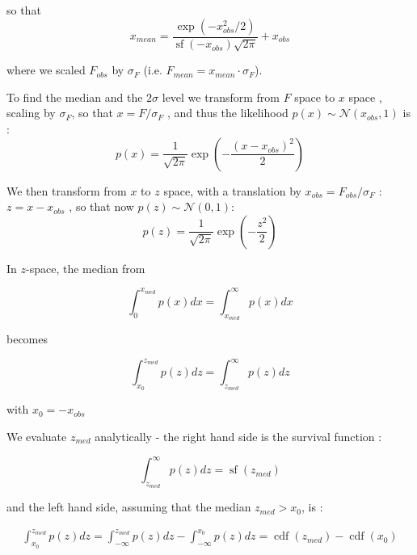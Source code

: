 \documentclass[fleqn,usenatbib]{mnras}  %
\DeclareMathOperator\cdf{cdf}
\DeclareMathOperator\sf{sf}
\begin{document}
so that 
\begin{equation}
x_{mean} = \frac{\exp{(- x_{obs}^{2} / 2 )} }{\sf{(-x_{obs})}\sqrt{2 \pi}} + x_{obs} 
\end{equation}

where we scaled $F_{obs}$ by  $\sigma_F$  (i.e. $F_{mean} = x_{mean} \cdot \sigma_{F}$). 



\bigskip

To find the median and the $2\sigma$ level we transform from $F$ space to $x$ space , scaling by  $\sigma_{F}$, so that $x = F / \sigma_{F}$ , and thus the likelihood $p(x) \sim \mathcal{N}(x_{obs},1)$ is :
\begin{equation}
p(x) = \frac{1}{\sqrt{2  \pi }} \exp{ \left(-\frac{(x-x_{obs})^{2}}{2}\right)}
\end{equation}

We  then transform from $x$ to $z$ space, with  a translation by $x_{obs} = F_{obs} / \sigma_{F}$ :  $z = x - x_{obs}$  , so that now  $p(z) \sim \mathcal{N}(0,1)$:
\begin{equation}
p(z) = \frac{1}{\sqrt{2  \pi }} \exp{ \left(-\frac{z^2}{2}\right)}
\end{equation}



In $z$-space, the median from 

\begin{equation}
\int_{0}^{x_{med}} {p(x)dx} = \int_{x_{med}}^{\infty} {p(x)dx}
\end{equation}
 
becomes 

\begin{equation}
\int_{x_{0}}^{z_{med}}{p(z)dz} = \int_{z_{med}}^{\infty}{p(z)dz}
\end{equation}

with  $x_{0}=-x_{obs}$

\bigskip

We evaluate $z_{med}$ analytically  - the right hand side is the survival function  : 

\begin{equation}
\int_{z_{med}}^{\infty}{p(z)dz} = \sf(z_{med})
\end{equation}

and the left hand side, assuming that the median $z_{med} > x_{0}$, is :

\begin{multline}
\int_{x_{0}}^{z_{med}}{p(z)dz} = \int_{-\infty}^{z_{med}}{p(z)dz} - \int_{-\infty}^{x_{0}}{p(z)dz} = \cdf(z_{med}) - \cdf(x_{0})
\end{multline}
\end{document}
